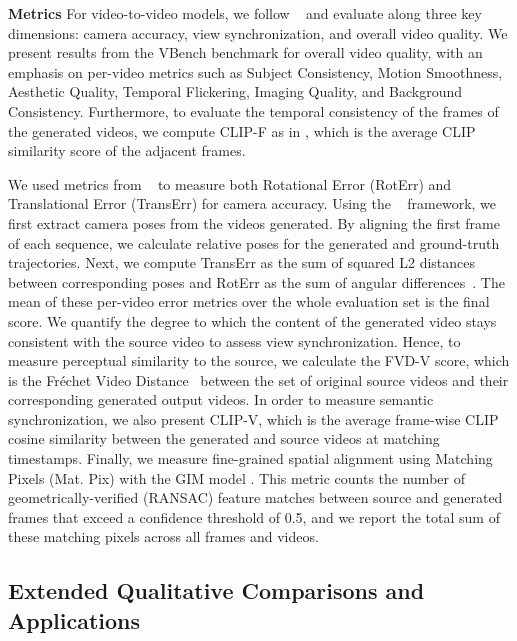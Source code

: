 \noindent\textbf{Metrics}
For video-to-video models, we follow \recammaster{}~\cite{bai2025recammaster} and evaluate along three key dimensions: camera accuracy, view synchronization, and overall video quality. We present results from the VBench \cite{eval_huang2024vbench} benchmark for overall video quality, with an emphasis on per-video metrics such as Subject Consistency, Motion Smoothness, Aesthetic Quality, Temporal Flickering, Imaging Quality, and Background Consistency. Furthermore, to evaluate the temporal consistency of the frames of the generated videos, we compute CLIP-F as in \cite{bai2025recammaster}, which is the average CLIP similarity score of
the adjacent frames. 


We used metrics from ~\cite{camera_traj_he2024cameractrl} to measure both Rotational Error (RotErr) and Translational Error (TransErr) for camera accuracy. Using the ~\cite{huang2025vipe} framework, we first extract camera poses from the videos generated. By aligning the first frame of each sequence, we calculate relative poses for the generated and ground-truth trajectories. Next, we compute TransErr as the sum of squared L2 distances between corresponding poses and RotErr as the sum of angular differences~\cite{camera_traj_he2024cameractrl}. The mean of these per-video error metrics over the whole evaluation set is the final score.
We quantify the degree to which the content of the generated video stays consistent with the source video to assess view synchronization. Hence, to measure perceptual similarity to the source, we calculate the FVD-V score, which is the Fréchet Video Distance~\cite{eval_unterthiner2019fvd} between the set of original source videos and their corresponding generated output videos. In order to measure semantic synchronization, we also present CLIP-V, which is the average frame-wise CLIP cosine similarity between the generated and source videos at matching timestamps. Finally, we measure fine-grained spatial alignment using Matching Pixels (Mat. Pix) with the GIM model \cite{eval_matpix}. This metric counts the number of geometrically-verified (RANSAC) feature matches between source and generated frames that exceed a confidence threshold of 0.5, and we report the total sum of these matching pixels across all frames and videos.


\subsection{Extended Qualitative Comparisons and Applications} \label{sec:supp_comparisons}

